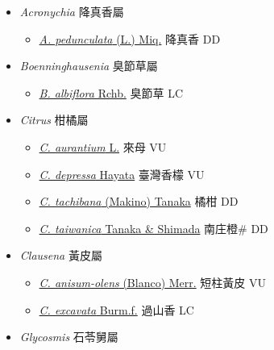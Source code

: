 
  \begin{itemize}
 \item[] \textit{Acronychia} 降真香屬
                    
  \begin{itemize}
        \item[] \href{http://www.theplantlist.org/tpl1.1/search?q=Acronychia+pedunculata}{\textit{A. pedunculata} (L.) Miq.}   降真香 DD
  \end{itemize}
 \item[] \textit{Boenninghausenia} 臭節草屬
                    
  \begin{itemize}
        \item[] \href{http://www.theplantlist.org/tpl1.1/search?q=Boenninghausenia+albiflora}{\textit{B. albiflora} Rchb.}   臭節草 LC
  \end{itemize}
 \item[] \textit{Citrus} 柑橘屬
                    
  \begin{itemize}
        \item[] \href{http://www.theplantlist.org/tpl1.1/search?q=Citrus+aurantium}{\textit{C. aurantium} L.}   來母 VU
        \item[] \href{http://www.theplantlist.org/tpl1.1/search?q=Citrus+depressa}{\textit{C. depressa} Hayata}   臺灣香檬 VU
        \item[] \href{http://www.theplantlist.org/tpl1.1/search?q=Citrus+tachibana}{\textit{C. tachibana} (Makino) Tanaka}   橘柑 DD
        \item[] \href{http://www.theplantlist.org/tpl1.1/search?q=Citrus+taiwanica}{\textit{C. taiwanica} Tanaka \& Shimada}   南庄橙\# DD
  \end{itemize}
 \item[] \textit{Clausena} 黃皮屬
                    
  \begin{itemize}
        \item[] \href{http://www.theplantlist.org/tpl1.1/search?q=Clausena+anisum-olens}{\textit{C. anisum-olens} (Blanco) Merr.}   短柱黃皮 VU
        \item[] \href{http://www.theplantlist.org/tpl1.1/search?q=Clausena+excavata}{\textit{C. excavata} Burm.f.}   過山香 LC
  \end{itemize}
 \item[] \textit{Glycosmis} 石苓舅屬
                    

\end{itemize}
